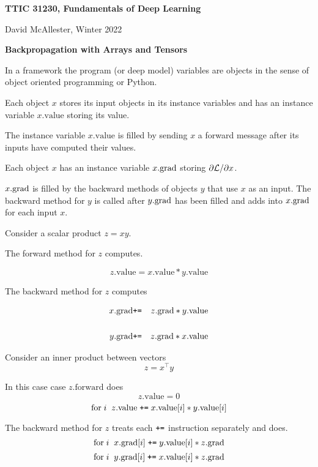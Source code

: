 




{\Huge
  
  \centerline{\bf TTIC 31230, Fundamentals of Deep Learning}
  \bigskip
  \centerline{David McAllester, Winter 2022}
  \vfill
  \vfill
  \centerline{\bf Backpropagation with Arrays and Tensors}
  \vfill
  \vfill



\vfill
In a framework the program (or deep model) variables are objects in the sense of object oriented programming or Python.

\vfill
Each object $x$ stores its input objects in its instance variables and has an instance variable $x.\mathrm{value}$ storing its value.

\vfill
The instance variable $x.\mathrm{value}$ is filled by sending $x$ a forward message after its inputs have computed their values.

\vfill
Each object $x$ has an instance variable $x.\mathrm{grad}$ storing $\partial {\cal L}/\partial x$.

\vfill
$x.\mathrm{grad}$ is filled by the backward methods of objects $y$ that
use $x$ as an input.  The backward method for $y$ is called after $y.\mathrm{grad}$ has been filled and adds into $x.\mathrm{grad}$ for each input $x$.


Consider a scalar product $z = xy$.

\vfill
The forward method for $z$ computes.

$$z.\mathrm{value} = x.\mathrm{value}*y.\mathrm{value}$$

\vfill
The backward method for $z$ computes

\begin{eqnarray*}
x.\mathrm{grad} & \mbox{\tt +=} & z.\mathrm{grad} * y.\mathrm{value} \\
\\
y.\mathrm{grad} & \mbox{\tt +=} & z.\mathrm{grad} * x.\mathrm{value}
\end{eqnarray*}


Consider an inner product between vectors
$$z = x^\top y$$

\vfill
In this case case $z.\mathrm{forward}$ does
$$z.\mathrm{value} = 0$$
$$\mathrm{for}\;i\;\;z.\mathrm{value} \;\mbox{\tt +=}\;x.\mathrm{value}[i]*y.\mathrm{value}[i]$$

\vfill
The backward method for $z$  treats each $\mbox{\tt +=}$ instruction separately and does.
$$\mathrm{for}\;i\;\;x.\mathrm{grad}[i] \;\mbox{\tt +=}\;y.\mathrm{value}[i]*z.\mathrm{grad}$$
$$\mathrm{for}\;i\;\;y.\mathrm{grad}[i] \;\mbox{\tt +=}\;x.\mathrm{value}[i]*z.\mathrm{grad}$$

}
